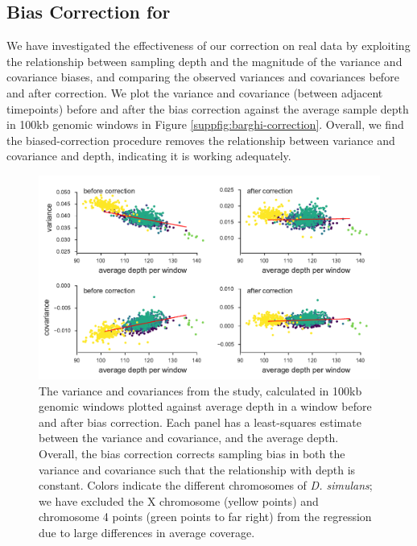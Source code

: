 \documentclass[11pt]{article}
\begin{document}
{{\begin{figure}[!ht]
  \label{suppfig:barghi-pca}
\end{figure}

\subsection{Bias Correction for \textcite{Barghi2019-qy}}

We have investigated the effectiveness of our correction on real data by
exploiting the relationship between sampling depth and the magnitude of the
variance and covariance biases, and comparing the observed variances and
covariances before and after correction. We plot the variance and covariance
(between adjacent timepoints) before and after the bias correction against the
average sample depth in 100kb genomic windows in Figure
\ref{suppfig:barghi-correction}. Overall, we find the biased-correction
procedure removes the relationship between variance and covariance and depth, indicating it is working adequately.

\begin{figure}[!ht]
  \centering
  \includegraphics[]{figures/barghi-correction-plot.pdf}

  \caption{The variance and covariances from the \textcite{Barghi2019-qy}
    study, calculated in 100kb genomic windows plotted against average depth in
    a window before and after bias correction.  Each panel has a least-squares
    estimate between the variance and covariance, and the average depth.
    Overall, the bias correction corrects sampling bias in both the variance
    and covariance such that the relationship with depth is constant. Colors
    indicate the different chromosomes of \emph{D. simulans}; we have excluded
  the X chromosome (yellow points) and chromosome 4 points (green points to far
right) from the regression due to large differences in average coverage.}


\end{figure}}}
\end{document}
